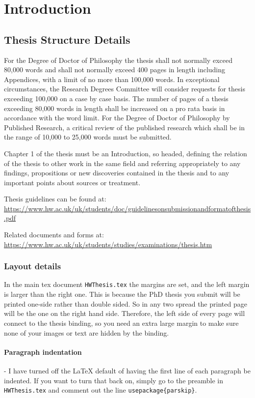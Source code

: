 \documentclass[../HWThesis.tex]{subfiles} %
\begin{document}
\chapter{Introduction}
\label{ch:introduction}

\section{Thesis Structure Details}
\label{sec: thesis details}
For the Degree of Doctor of Philosophy the thesis shall not normally exceed 80,000 words and shall not normally exceed 400 pages in length including Appendices, with a limit of no more than 100,000 words. In exceptional circumstances, the Research Degrees Committee will consider requests for thesis exceeding 100,000 on a case by case basis. The number of pages of a thesis exceeding 80,000 words in length shall be increased on a pro rata basis in accordance with the word limit.  For the Degree of Doctor of Philosophy by Published Research, a critical review of the published research which shall be in the range of 10,000 to 25,000 words must be submitted.

Chapter 1 of the thesis must be an Introduction, so headed, defining the relation of the thesis to other work in the same field and referring appropriately to any findings, propositions or new discoveries contained in the thesis and to any important points about sources or treatment.

Thesis guidelines can be found at: \\ \url{https://www.hw.ac.uk/uk/students/doc/guidelinesonsubmissionandformatofthesis.pdf }

Related documents and forms at: \url{https://www.hw.ac.uk/uk/students/studies/examinations/thesis.htm}

\subsection{Layout details}
\label{sec: layout}
In the main tex document \texttt{HWThesis.tex} the margins are set, and the left margin is larger than the right one. This is because the PhD thesis you submit will be printed one-side rather than double sided. So in any two spread the printed page will be the one on the right hand side. Therefore, the left side of every page will connect to the thesis binding, so you need an extra large margin to make sure none of your images or text are hidden by the binding.

\subsubsection{Paragraph indentation} - I have turned off the LaTeX default of having the first line of each paragraph be indented. If you want to turn that back on, simply go to the preamble in \texttt{HWThesis.tex} and comment out the line \texttt{usepackage\{parskip\}}.
\end{document}

